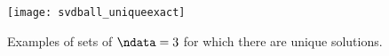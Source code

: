 \documentclass[11pt,titlepage,fleqn]{article}
\begin{document}


\clearpage\pagebreak
\begin{figure}
\centering
\texttt{[image: svdball\_uniqueexact]}
\caption[]
{{
Examples of sets of $\ndata = 3$ for which there are unique solutions.
\label{fig:unique}
}}
\end{figure}

\end{document}
